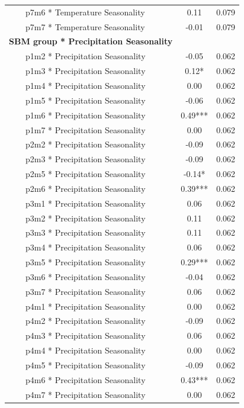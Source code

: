 \documentclass[
]{agujournal2019}
\begin{document}
\begin{longtable*}{lcc}
    p7m6 * Temperature Seasonality & 0.11 & 0.079 \\ 
    p7m7 * Temperature Seasonality & -0.01 & 0.079 \\ 
\textbf{SBM group * Precipitation Seasonality} &  &  \\ 
    p1m2 * Precipitation Seasonality & -0.05 & 0.062 \\ 
    p1m3 * Precipitation Seasonality & 0.12* & 0.062 \\ 
    p1m4 * Precipitation Seasonality & 0.00 & 0.062 \\ 
    p1m5 * Precipitation Seasonality & -0.06 & 0.062 \\ 
    p1m6 * Precipitation Seasonality & 0.49*** & 0.062 \\ 
    p1m7 * Precipitation Seasonality & 0.00 & 0.062 \\ 
    p2m2 * Precipitation Seasonality & -0.09 & 0.062 \\ 
    p2m3 * Precipitation Seasonality & -0.09 & 0.062 \\ 
    p2m5 * Precipitation Seasonality & -0.14* & 0.062 \\ 
    p2m6 * Precipitation Seasonality & 0.39*** & 0.062 \\ 
    p3m1 * Precipitation Seasonality & 0.06 & 0.062 \\ 
    p3m2 * Precipitation Seasonality & 0.11 & 0.062 \\ 
    p3m3 * Precipitation Seasonality & 0.11 & 0.062 \\ 
    p3m4 * Precipitation Seasonality & 0.06 & 0.062 \\ 
    p3m5 * Precipitation Seasonality & 0.29*** & 0.062 \\ 
    p3m6 * Precipitation Seasonality & -0.04 & 0.062 \\ 
    p3m7 * Precipitation Seasonality & 0.06 & 0.062 \\ 
    p4m1 * Precipitation Seasonality & 0.00 & 0.062 \\ 
    p4m2 * Precipitation Seasonality & -0.09 & 0.062 \\ 
    p4m3 * Precipitation Seasonality & 0.06 & 0.062 \\ 
    p4m4 * Precipitation Seasonality & 0.00 & 0.062 \\ 
    p4m5 * Precipitation Seasonality & -0.09 & 0.062 \\ 
    p4m6 * Precipitation Seasonality & 0.43*** & 0.062 \\ 
    p4m7 * Precipitation Seasonality & 0.00 & 0.062 \\ 

\end{longtable*}
\end{document}
